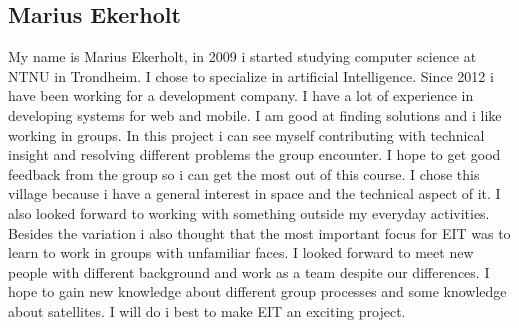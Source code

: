 \subsection{Marius Ekerholt}

My name is Marius Ekerholt, in 2009 i started studying computer science at NTNU in Trondheim. I chose to  specialize in artificial Intelligence. Since 2012 i have been working for a development company. I have a lot of experience in developing systems for web and mobile. I am good at finding solutions and i like working in groups. In this project i can see myself contributing with technical insight and resolving different problems the group encounter. I hope to get good feedback from the group so i can get the most out of this course. I chose this village because i have a general interest in space and the technical aspect of it. I also looked forward to working with something outside my everyday activities. Besides the variation i also thought that the most important focus for EIT was to learn to work in groups with unfamiliar faces. I looked forward to meet new people with different background and work as a team despite our differences. I hope to gain new knowledge about different group processes and some knowledge about satellites. I will do i best to make EIT an exciting project. 
 